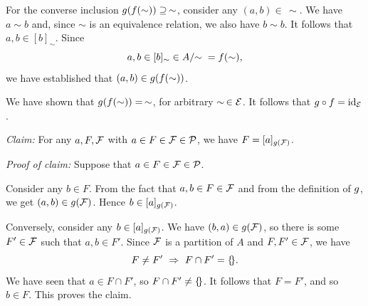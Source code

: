 \documentclass[12pt]{article}
\renewcommand{\emptyset}{\{\hspace{-2pt}\}}
\newcommand{\REL}{\sim}
\newcommand{\MODREL}[1]{#1/\hspace{-3pt}\REL{}}
\newcommand{\CLASS}[2]{[#1]_{#2}}
\newcommand{\id}[1]{\textrm{id}_{#1}}
\begin{document}
{For the converse inclusion $\corrinv(\corr(\REL))\supseteq\,\REL$, consider any $(a,b)\in\,\REL$.
We have $a\REL b$ and, since $\REL$ is an equivalence relation, we also have $b\REL b$.
It follows that $a,b\in\CLASS{b}{\REL}$.
Since $$a,b\in\CLASS{b}{\REL}\in\MODREL{A}=\corr(\REL),$$
we have established that $(a,b)\in\corrinv(\corr(\REL))$.

We have shown that $\corrinv(\corr(\REL))=\,\REL$, for arbitrary $\REL\,\in\eqrelnsA$.
It follows that $\corrinv\circ\corr =\id{\eqrelnsA}$.

\textit{Claim:} For any $a,F,\mathcal{F}$ with $a\in F\in\mathcal{F}\in\mathcal{P}$, we have $F=\CLASS{a}{\corrinv(\part)}$.

\textit{Proof of claim:}
Suppose that $a\in F\in\mathcal{F}\in\mathcal{P}$.

Consider any $b\in F$.
From the fact that $a,b\in F\in \mathcal{F}$ and from the definition of $g$, we get $(a,b)\in g(\mathcal{F})$.
Hence $b\in\CLASS{a}{\corrinv(\part)}$.

Conversely, consider any $b\in \CLASS{a}{\corrinv(\part)}$. We have $(b,a)\in g(\mathcal{F})$,
so there is some $F'\in\mathcal{F}$ such that $a,b\in F'$. Since $\mathcal{F}$ is a partition of $A$
and $F,F'\in\mathcal{F}$, we have
$$ F\neq F'\ \Rightarrow\ F\cap F'=\emptyset.  $$
We have seen that $a\in F\cap F'$, so $F\cap F'\neq\emptyset$.
It follows that $F=F'$, and so $b\in F$. This proves the claim.

}
\end{document}
